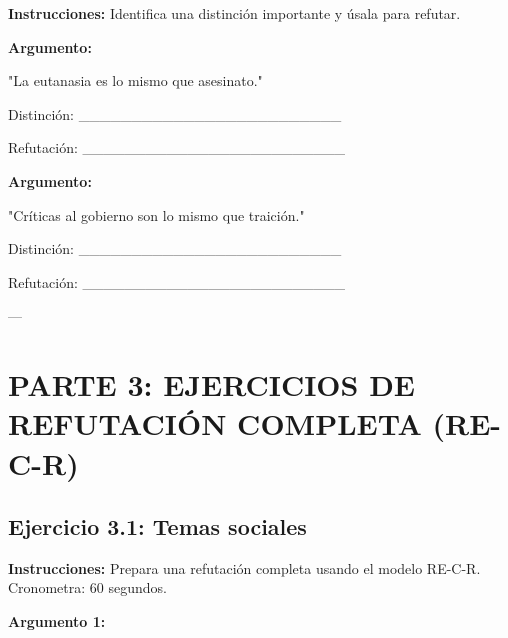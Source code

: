 \documentclass[a4paper,11pt]{article}
\begin{document}
\vspace{0.2cm}

\textbf{Instrucciones:} Identifica una distinción importante y úsala para refutar.

\vspace{0.2cm}

\textbf{Argumento:}

"La eutanasia es lo mismo que asesinato."

\vspace{0.2cm}

Distinción: _________________________

\vspace{0.2cm}

Refutación: _________________________

\vspace{0.2cm}

\textbf{Argumento:}

"Críticas al gobierno son lo mismo que traición."

\vspace{0.2cm}

Distinción: _________________________

\vspace{0.2cm}

Refutación: _________________________

\vspace{0.2cm}

---

\vspace{0.2cm}

\section{PARTE 3: EJERCICIOS DE REFUTACIÓN COMPLETA (RE-C-R)}

\vspace{0.2cm}

\subsection{Ejercicio 3.1: Temas sociales}

\vspace{0.2cm}

\textbf{Instrucciones:} Prepara una refutación completa usando el modelo RE-C-R. Cronometra: 60 segundos.

\vspace{0.2cm}

\textbf{Argumento 1:}
\end{document}
